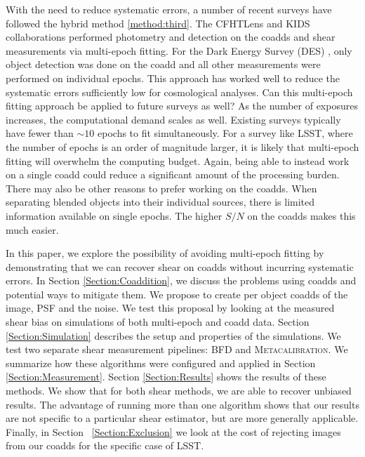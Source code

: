 \documentclass[fleqn,useAMS,usenatbib]{mnras}
\newcommand{\Mcal}{\textsc{Metacalibration}}
\begin{document}
With the need to reduce systematic errors, a number of recent surveys have 
followed the hybrid method \ref{method:third}.  The CFHTLens 
\citep{Heymans2013} and KIDS \citep{Hildebrandt2017} collaborations performed 
photometry and detection on the coadds and shear measurements via multi-epoch 
fitting. For the Dark Energy Survey (DES) \citep{Zuntz2017}, only object 
detection was done on the coadd and all other measurements were performed on 
individual epochs.  This approach has worked well to reduce the systematic 
errors sufficiently low for cosmological analyses.  Can this multi-epoch 
fitting approach be applied to future surveys as well?
As the number of exposures increases, the computational demand scales as well.  
Existing surveys typically have fewer than $\sim10$ epochs to fit 
simultaneously. For a survey like LSST, where the number of epochs is an order 
of magnitude larger, it is likely that multi-epoch fitting will overwhelm the 
computing budget.  Again, being able to instead work on a single coadd could 
reduce a significant amount of the processing burden.  There may also be other 
reasons to prefer working on the coadds.  When separating blended objects into 
their individual sources, there is limited information available on single 
epochs.  The higher $S/N$ on the coadds makes this much easier.  

In this paper, we explore the possibility of avoiding multi-epoch fitting by 
demonstrating that we can recover shear on coadds without incurring systematic 
errors.  In Section \ref{Section:Coaddition}, we discuss the problems using 
coadds and potential ways to mitigate them.  We propose to create per object 
coadds of the image, PSF and the noise.  We test this proposal by looking at 
the measured shear bias on simulations of both multi-epoch and coadd data.  
Section \ref{Section:Simulation} describes the setup and properties of the 
simulations.  We test two separate shear measurement pipelines: BFD and 
\Mcal.  We summarize how these algorithms were configured and applied 
in Section \ref{Section:Measurement}.  Section \ref{Section:Results} shows the 
results of these methods.  We show that for both shear methods, we are able to 
recover unbiased results.  The advantage of running more than one algorithm 
shows that our results are not specific to a particular shear estimator, but 
are more generally applicable.   Finally, in Section ~\ref{Section:Exclusion} 
we look at the cost of rejecting images from our coadds for the specific case 
of LSST.
\end{document}
